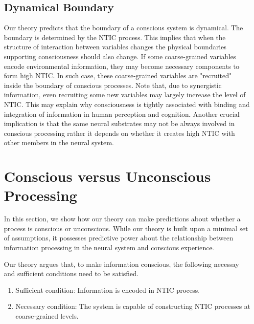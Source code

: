 \documentclass[utf8]{article}
\begin{document}
        \subsection{Dynamical Boundary}
        Our theory predicts that the boundary of a conscious system is dynamical. The boundary is determined by the NTIC process. This implies that when the structure of interaction between variables changes the physical boundaries supporting consciousness should also change. If some coarse-grained variables encode environmental information, they may become necessary components to form high NTIC. In such case, these coarse-grained variables are "recruited" inside the boundary of conscious processes. Note that, due to synergistic information, even recruiting some new variables may largely increase the level of NTIC. 
        This may explain why consciousness is tightly associated with binding and integration of information in human perception and cognition. Another crucial implication is that the same neural substrates may not be always involved in conscious processing rather it depends on whether it creates high NTIC with other members in the neural system. 
    
    
	\section{Conscious versus Unconscious Processing}\label{sec:Conscious versus Unconscious Processing}
	    In this section, we show how our theory can make predictions about whether a process is conscious or unconscious. While our theory is built upon a minimal set of assumptions, it possesses predictive power about the relationship between information processing in the neural system and conscious experience.
	    
		Our theory argues that, to make information conscious, the following necessay and sufficient conditions need to be satisfied.
		\begin{enumerate}
		    \item Sufficient condition: Information is encoded in NTIC process. 
		    \item Necessary condition: The system is capable of constructing NTIC processes at coarse-grained levels. 
		\end{enumerate}		
		
\end{document}
